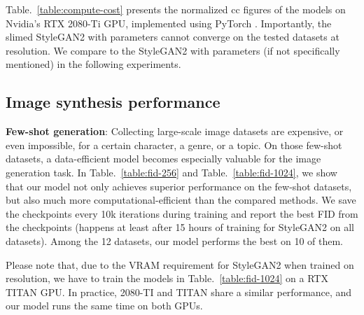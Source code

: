 \documentclass{article} \usepackage{iclr2021_conference,times}
\begin{document}
Table.~\ref{table:compute-cost} presents the normalized cc figures of the models on Nvidia's RTX 2080-Ti GPU, implemented using PyTorch \citep{paszke2017automatic}. Importantly, the slimed StyleGAN2 with  parameters cannot converge on the tested datasets at  resolution. We compare to the StyleGAN2 with  parameters (if not specifically mentioned) in the following experiments.


\subsection{Image synthesis performance}
\textbf{Few-shot generation}: Collecting large-scale image datasets are expensive, or even impossible, for a certain character, a genre, or a topic. On those few-shot datasets, a data-efficient model becomes especially valuable for the image generation task. In Table.~\ref{table:fid-256} and Table.~\ref{table:fid-1024}, we show that our model not only achieves superior performance on the few-shot datasets, but also much more computational-efficient than the compared methods. We save the checkpoints every 10k iterations during training and report the best FID from the checkpoints (happens at least after 15 hours of training for StyleGAN2 on all datasets). Among the 12 datasets, our model performs the best on 10 of them.

Please note that, due to the VRAM requirement for StyleGAN2 when trained on  resolution, we have to train the models in Table.~\ref{table:fid-1024} on a RTX TITAN GPU. In practice, 2080-TI and TITAN share a similar performance, and our model runs the same time on both GPUs.
\end{document}
